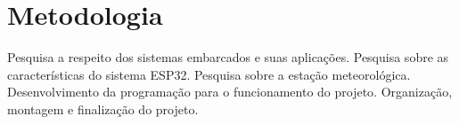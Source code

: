 \chapter{Metodologia}
\label{chap:metodologia}

 Pesquisa a respeito dos sistemas embarcados e suas aplicações. Pesquisa sobre as características do sistema ESP32. Pesquisa sobre a estação meteorológica. Desenvolvimento da programação para o funcionamento do projeto. Organização, montagem e finalização do projeto.